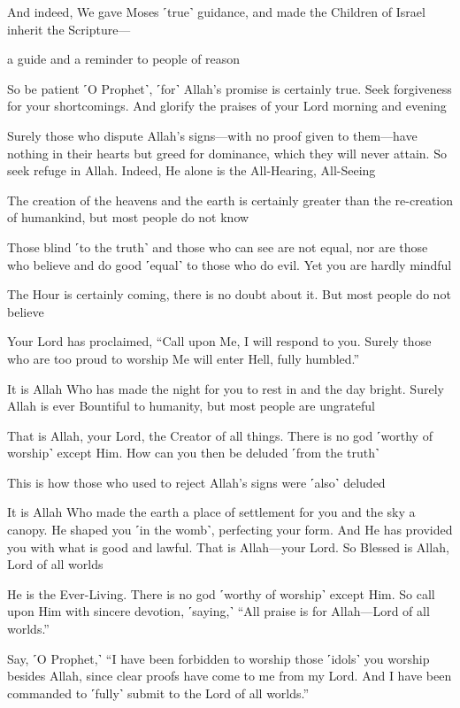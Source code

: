 And indeed, We gave Moses ˹true˺ guidance, and made the Children of Israel inherit the Scripture—

a guide and a reminder to people of reason

So be patient ˹O Prophet˺, ˹for˺ Allah’s promise is certainly true. Seek forgiveness for your shortcomings. And glorify the praises of your Lord morning and evening

Surely those who dispute Allah’s signs—with no proof given to them—have nothing in their hearts but greed for dominance, which they will never attain. So seek refuge in Allah. Indeed, He alone is the All-Hearing, All-Seeing

The creation of the heavens and the earth is certainly greater than the re-creation of humankind, but most people do not know

Those blind ˹to the truth˺ and those who can see are not equal, nor are those who believe and do good ˹equal˺ to those who do evil. Yet you are hardly mindful

The Hour is certainly coming, there is no doubt about it. But most people do not believe

Your Lord has proclaimed, “Call upon Me, I will respond to you. Surely those who are too proud to worship Me will enter Hell, fully humbled.”

It is Allah Who has made the night for you to rest in and the day bright. Surely Allah is ever Bountiful to humanity, but most people are ungrateful

That is Allah, your Lord, the Creator of all things. There is no god ˹worthy of worship˺ except Him. How can you then be deluded ˹from the truth˺

This is how those who used to reject Allah’s signs were ˹also˺ deluded

It is Allah Who made the earth a place of settlement for you and the sky a canopy. He shaped you ˹in the womb˺, perfecting your form. And He has provided you with what is good and lawful. That is Allah—your Lord. So Blessed is Allah, Lord of all worlds

He is the Ever-Living. There is no god ˹worthy of worship˺ except Him. So call upon Him with sincere devotion, ˹saying,˺ “All praise is for Allah—Lord of all worlds.”

Say, ˹O Prophet,˺ “I have been forbidden to worship those ˹idols˺ you worship besides Allah, since clear proofs have come to me from my Lord. And I have been commanded to ˹fully˺ submit to the Lord of all worlds.”

